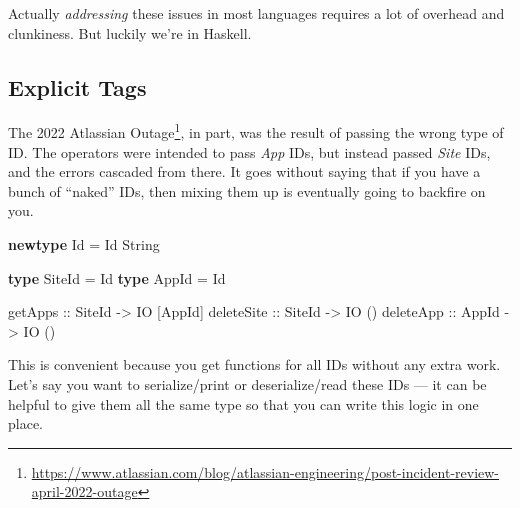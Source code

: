 \documentclass[]{article}
\newenvironment{Shaded}{}{}
\newcommand{\DataTypeTok}[1]{\textcolor[rgb]{0.56,0.13,0.00}{#1}}
\newcommand{\KeywordTok}[1]{\textcolor[rgb]{0.00,0.44,0.13}{\textbf{#1}}}
\newcommand{\NormalTok}[1]{#1}
\newcommand{\OperatorTok}[1]{\textcolor[rgb]{0.40,0.40,0.40}{#1}}
\newcommand{\OtherTok}[1]{\textcolor[rgb]{0.00,0.44,0.13}{#1}}
\newcommand{\StringTok}[1]{\textcolor[rgb]{0.25,0.44,0.63}{#1}}
\renewcommand{\href}[2]{#2\footnote{\url{#1}}}
\begin{document}
Actually \emph{addressing} these issues in most languages requires a lot of
overhead and clunkiness. But luckily we're in Haskell.

\subsection{Explicit Tags}\label{explicit-tags}

The
\href{https://www.atlassian.com/blog/atlassian-engineering/post-incident-review-april-2022-outage}{2022
Atlassian Outage}, in part, was the result of passing the wrong type of ID. The
operators were intended to pass \emph{App} IDs, but instead passed \emph{Site}
IDs, and the errors cascaded from there. It goes without saying that if you have
a bunch of ``naked'' IDs, then mixing them up is eventually going to backfire on
you.

\begin{Shaded}
\begin{Highlighting}[]
\KeywordTok{newtype} \DataTypeTok{Id} \OtherTok{=} \DataTypeTok{Id} \DataTypeTok{String}

\KeywordTok{type} \DataTypeTok{SiteId} \OtherTok{=} \DataTypeTok{Id}
\KeywordTok{type} \DataTypeTok{AppId} \OtherTok{=} \DataTypeTok{Id}

\OtherTok{getApps ::} \DataTypeTok{SiteId} \OtherTok{{-}\textgreater{}} \DataTypeTok{IO}\NormalTok{ [}\DataTypeTok{AppId}\NormalTok{]}
\OtherTok{deleteSite ::} \DataTypeTok{SiteId} \OtherTok{{-}\textgreater{}} \DataTypeTok{IO}\NormalTok{ ()}
\OtherTok{deleteApp ::} \DataTypeTok{AppId} \OtherTok{{-}\textgreater{}} \DataTypeTok{IO}\NormalTok{ ()}
\end{Highlighting}
\end{Shaded}

This is convenient because you get functions for all IDs without any extra work.
Let's say you want to serialize/print or deserialize/read these IDs --- it can
be helpful to give them all the same type so that you can write this logic in
one place.

\begin{Shaded}
\end{Shaded}
\end{document}
